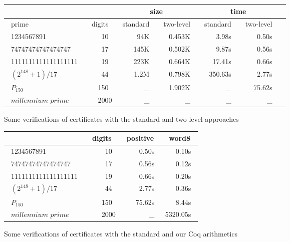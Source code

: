 \begin{figure}
\begin{center}
\begin{tabular}{|l|r|r|r|r|r|r|}
\cline{3-6}
\multicolumn{2}{c}{} & \multicolumn{2}{|c|}{size} &
                                               \multicolumn{2}{c|}{time} \\
\hline
~prime     ~     & \multicolumn{1}{c|}{~digits~ } & ~standard~  &
  \multicolumn{1}{c|}{ ~two-level~ } &
  \multicolumn{1}{c|}{ ~standard~ } &
  \multicolumn{1}{c|}{ ~two-level~ } \\
\hline
~1234567891       ~   & 10~ &  94K~ &  ~0.453K~ & 3.98s~  & 0.50s~  \\
~74747474747474747~   & 17~ & 145K~ &  0.502K~ &   9.87s~ & 0.56s~ \\
~1111111111111111111~ & 19~ & 223K~ &  0.664K~ & 17.41s~  & 0.66s~   \\
~$(2^{148}+1)/17$ ~   & 44~ & 1.2M~ & 0.798K~ & ~350.63s~  & 2.77s~   \\
~$P_{150}$   ~        &150~ &  \_~  & 1.902K~   &  \_~   & 75.62s~  \\
~$\textit{millennium prime}$~   &2000 & \_~   & \_~      & \_~    & \_~ \\
\hline
\end{tabular}
\end{center}
\caption{Some verifications of certificates with the standard and two-level approaches}
\label{fig:TimeComp}
\end{figure} 
\begin{figure}
\begin{center}
\begin{tabular}{|l|r| r|r|}
\hline
 & ~digits~ & ~positive~ & ~word8~ \\
\hline
~1234567891       ~  & 10~  & 0.50s~  & 0.10s~  \\
~74747474747474747~  & 17~ & 0.56s~  & 0.12s~  \\
~1111111111111111111~ & 19~ & 0.66s~ & 0.20s~  \\
~$(2^{148}+1)/17$ ~   & 44~ & 2.77s~  & 0.36s~  \\
~$P_{150}$   ~       & 150~ & 75.62s~  & 8.44s~  \\
~$\textit{millennium prime}$~   &2000 & \_~   & 5320.05s~ \\
\hline
\end{tabular}
\end{center}
\caption{Some verifications of certificates with the standard and our {\sc Coq} arithmetics}
\label{fig:TimeCompW}
\end{figure} 
